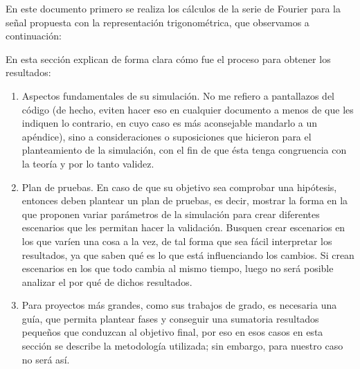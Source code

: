\documentclass[12pt]{article}
\begin{document}
    En este documento primero se realiza los cálculos de la serie de Fourier para la señal propuesta 
    con la representación trigonométrica, que observamos a continuación:
    

    En esta sección explican de forma clara cómo fue el proceso para obtener los resultados:
    \begin{enumerate}
        \item Aspectos fundamentales de su simulación. No me refiero a pantallazos del código 
        (de hecho, eviten hacer eso en cualquier documento a menos de que les indiquen 
        lo contrario, en cuyo caso es más aconsejable mandarlo a un apéndice), sino a 
        consideraciones o suposiciones que hicieron para el planteamiento de la simulación, 
        con el fin de que ésta tenga congruencia con la teoría y por lo tanto validez. 

        \item Plan de pruebas. En caso de que su objetivo sea comprobar una hipótesis, entonces 
        deben plantear un plan de pruebas, es decir, mostrar la forma en la que proponen 
        variar parámetros de la simulación para crear diferentes escenarios que les permitan 
        hacer la validación. Busquen crear escenarios en los que varíen una cosa a la vez, 
        de tal forma que sea fácil interpretar los resultados, ya que saben qué es lo que está 
        influenciando los cambios. Si crean escenarios en los que todo cambia al mismo 
        tiempo, luego no será posible analizar el por qué de dichos resultados. 

        \item Para proyectos más grandes, como sus trabajos de grado, es necesaria una guía, 
        que permita plantear fases y conseguir una sumatoria resultados pequeños que 
        conduzcan al objetivo final, por eso en esos casos en esta sección se describe la 
        metodología utilizada; sin embargo, para nuestro caso no será así. 
    \end{enumerate}
\end{document}
